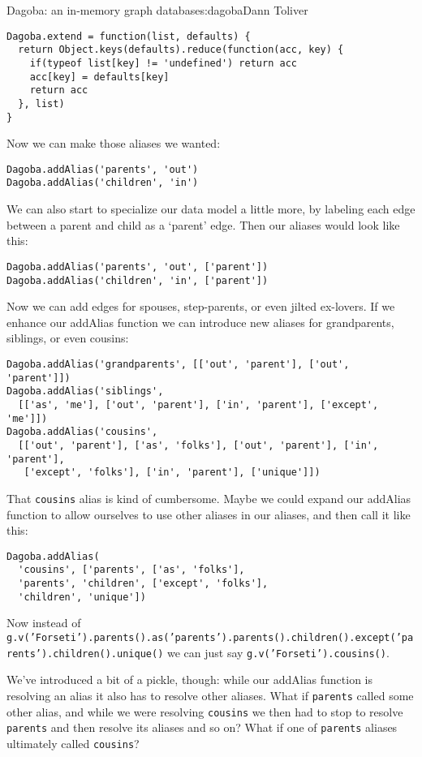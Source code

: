 \begin{aosachapter}{Dagoba: an in-memory graph database}{s:dagoba}{Dann Toliver}
\begin{verbatim}
Dagoba.extend = function(list, defaults) {
  return Object.keys(defaults).reduce(function(acc, key) {
    if(typeof list[key] != 'undefined') return acc
    acc[key] = defaults[key]
    return acc
  }, list)
}
\end{verbatim}

Now we can make those aliases we wanted:

\begin{verbatim}
Dagoba.addAlias('parents', 'out')
Dagoba.addAlias('children', 'in')
\end{verbatim}

We can also start to specialize our data model a little more, by
labeling each edge between a parent and child as a `parent' edge. Then
our aliases would look like this:

\begin{verbatim}
Dagoba.addAlias('parents', 'out', ['parent'])
Dagoba.addAlias('children', 'in', ['parent'])
\end{verbatim}

Now we can add edges for spouses, step-parents, or even jilted
ex-lovers. If we enhance our addAlias function we can introduce new
aliases for grandparents, siblings, or even cousins:

\begin{verbatim}
Dagoba.addAlias('grandparents', [['out', 'parent'], ['out', 'parent']])
Dagoba.addAlias('siblings', 
  [['as', 'me'], ['out', 'parent'], ['in', 'parent'], ['except', 'me']])
Dagoba.addAlias('cousins', 
  [['out', 'parent'], ['as', 'folks'], ['out', 'parent'], ['in', 'parent'],
   ['except', 'folks'], ['in', 'parent'], ['unique']])
\end{verbatim}

That \texttt{cousins} alias is kind of cumbersome. Maybe we could expand
our addAlias function to allow ourselves to use other aliases in our
aliases, and then call it like this:

\begin{verbatim}
Dagoba.addAlias(
  'cousins', ['parents', ['as', 'folks'], 
  'parents', 'children', ['except', 'folks'], 
  'children', 'unique'])
\end{verbatim}

Now instead of
\texttt{g.v('Forseti').parents().as('parents').parents().children().except('parents').children().unique()}
we can just say \texttt{g.v('Forseti').cousins()}.

We've introduced a bit of a pickle, though: while our addAlias function
is resolving an alias it also has to resolve other aliases. What if
\texttt{parents} called some other alias, and while we were resolving
\texttt{cousins} we then had to stop to resolve \texttt{parents} and
then resolve its aliases and so on? What if one of \texttt{parents}
aliases ultimately called \texttt{cousins}?


\end{aosachapter}
